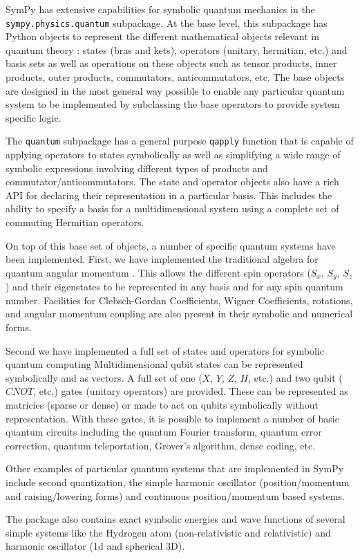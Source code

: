 SymPy has extensive capabilities for symbolic quantum mechanics in the
\verb|sympy.physics.quantum| subpackage. At the base level, this subpackage has
Python objects to represent the different mathematical objects relevant in
quantum theory \cite{sakurai}: states (bras and kets), operators (unitary,
hermitian, etc.) and basis sets as well as operations on these objects such as
tensor products, inner products, outer products, commutators, anticommutators,
etc.  The base objects are designed in the most general way possible to enable
any particular quantum system to be implemented by subclassing the base
operators to provide system specific logic.

The \verb|quantum| subpackage has a general purpose \verb|qapply| function that
is capable of applying operators to states symbolically as well as simplifying
a wide range of symbolic expressions involving different types of products and
commutator/anticommutators. The state and operator objects also have a rich API
for declaring their representation in a particular basis. This includes the
ability to specify a basis for a multidimensional system using a complete set
of commuting Hermitian operators.

On top of this base set of objects, a number of specific quantum systems have
been implemented. First, we have implemented the traditional algebra for
quantum angular momentum \cite{zare}. This allows the different spin operators
($S_x$, $S_y$, $S_z$) and their eigenstates to be represented in any basis and
for any spin quantum number. Facilities for Clebsch-Gordan Coefficients, Wigner
Coefficients, rotations, and angular momentum coupling are also present in
their symbolic and numerical forms.

Second we have implemented a full set of states and operators for symbolic
quantum computing \cite{nielsen} Multidimensional qubit states can be
represented symbolically and as vectors. A full set of one ($X$, $Y$, $Z$, $H$,
etc.) and two qubit ($CNOT$, etc.) gates (unitary operators) are provided.
These can be represented as matricies (sparse or dense) or made to act on
qubits symbolically without representation. With these gates, it is possible to
implement a number of basic quantum circuits including the quantum Fourier
transform, quantum error correction, quantum teleportation, Grover's algorithm,
dense coding, etc.

Other examples of particular quantum systems that are implemented in SymPy
include second quantization, the simple harmonic oscillator (position/momentum
and raising/lowering forms) and continuous position/momentum based systems.

The package also contains exact symbolic energies and wave functions of several
simple systems like the Hydrogen atom (non-relativistic and relativistic) and
harmonic oscillator (1d and spherical 3D).
